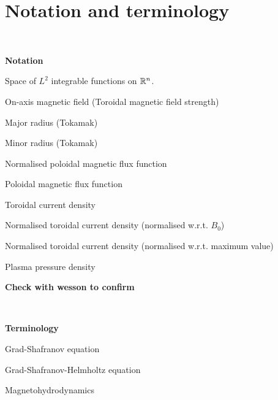 

\chapter{Notation and terminology}\label{notation}

\renewcommand{\thefootnote}{\fnsymbol{footnote}}


\

\noindent\textbf{Notation}


\newcommand{\nttn}[2]{\item[{\ \makebox[3.18cm][l]{#1}}]{#2}}
\begin{list}{}{ \setlength{\leftmargin}{3.4cm}
                \setlength{\labelwidth}{3.4cm}}

\nttn{$L^2(\R^n)$}{Space of $L^2$ integrable functions on $\mathbb{R}^n$.}

\nttn{$B_0$}{On-axis magnetic field (Toroidal magnetic field strength)}
\nttn{$R_0$}{Major radius (Tokamak)}
\nttn{$a$}{Minor radius (Tokamak)}
\nttn{$\psi$}{Normalised poloidal magnetic flux function}
\nttn{$\Psi$}{Poloidal magnetic flux function}
\nttn{$J_{\phi}$}{Toroidal current density}
\nttn{$j_{\phi}$}{Normalised toroidal current density (normalised w.r.t. $B_0$)}
\nttn{$I_{\rho}$}{Normalised toroidal current density (normalised w.r.t. maximum value)}
\nttn{$p$}{Plasma pressure density}
\nttn{$\beta$}{\textbf{Check with wesson to confirm}}

\end{list}

\

\noindent\textbf{Terminology}


\newcommand{\term}[2]{\item[{\ \makebox[4.58cm][l]{#1}}]{#2}}
\begin{list}{}{ \setlength{\leftmargin}{4.8cm}
                \setlength{\labelwidth}{4.8cm}}


\term{GS(E)}{Grad-Shafranov equation}
\term{GSH}{Grad-Shafranov-Helmholtz equation}
\term{MHD}{Magnetohydrodynamics}


\end{list}
